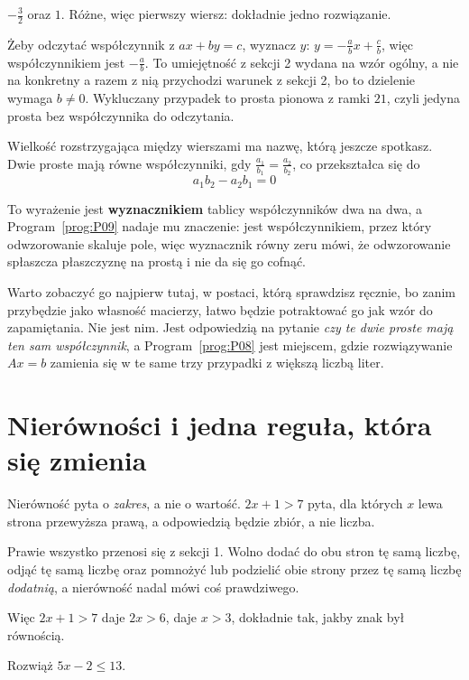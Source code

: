 \begin{fr}
\begin{ansblock}
$-\frac{3}{2}$ oraz $1$. Różne, więc pierwszy wiersz: dokładnie jedno
rozwiązanie.
\end{ansblock}

Żeby odczytać współczynnik z $ax + by = c$, wyznacz $y$:
$y = -\frac{a}{b}x + \frac{c}{b}$, więc współczynnikiem jest $-\frac{a}{b}$.
To umiejętność z sekcji 2 wydana na wzór ogólny, a nie na konkretny \dash{} a
razem z nią przychodzi warunek z sekcji 2, bo to dzielenie wymaga
$b \ne 0$. Wykluczany przypadek to prosta pionowa z ramki $21$, czyli jedyna
prosta bez współczynnika do odczytania.

Wielkość rozstrzygająca między wierszami ma nazwę, którą jeszcze spotkasz. Dwie
proste mają równe współczynniki, gdy $\frac{a_1}{b_1} = \frac{a_2}{b_2}$, co
przekształca się do
\[ a_1 b_2 - a_2 b_1 = 0 \]

\begin{aibox}
To wyrażenie jest \textbf{wyznacznikiem} tablicy współczynników dwa na dwa, a
Program~\ref{prog:P09} nadaje mu znaczenie: jest współczynnikiem, przez który
odwzorowanie skaluje pole, więc wyznacznik równy zeru mówi, że odwzorowanie
spłaszcza płaszczyznę na prostą i nie da się go cofnąć.

Warto zobaczyć go najpierw tutaj, w postaci, którą sprawdzisz ręcznie, bo
zanim przybędzie jako własność macierzy, łatwo będzie potraktować go jak wzór
do zapamiętania. Nie jest nim. Jest odpowiedzią na pytanie \emph{czy te dwie
proste mają ten sam współczynnik}, a Program~\ref{prog:P08} jest miejscem,
gdzie rozwiązywanie $Ax = b$ zamienia się w te same trzy przypadki z większą
liczbą liter.
\end{aibox}
\end{fr}


\section{Nierówności i jedna reguła, która się zmienia}
\label{sec:F06-inequalities}

\begin{fr}
Nierówność pyta o \emph{zakres}, a nie o wartość. $2x + 1 > 7$ pyta, dla
których $x$ lewa strona przewyższa prawą, a odpowiedzią będzie zbiór, a nie
liczba.

Prawie wszystko przenosi się z sekcji 1. Wolno dodać do obu stron tę samą
liczbę, odjąć tę samą liczbę oraz pomnożyć lub podzielić obie strony przez tę
samą liczbę \emph{dodatnią}, a nierówność nadal mówi coś prawdziwego.

Więc $2x + 1 > 7$ daje $2x > 6$, daje $x > 3$, dokładnie tak, jakby znak był
równością.

Rozwiąż $5x - 2 \le 13$.
\nextframe
\end{fr}

